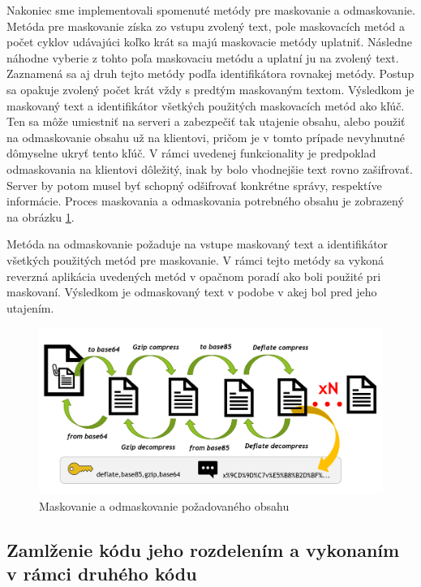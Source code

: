 \documentclass[conference, 11pt,slovak,a4paper,twoside]{IEEEtran}
\begin{document}
Nakoniec sme implementovali spomenuté metódy pre maskovanie a odmaskovanie. Metóda pre maskovanie získa zo vstupu zvolený text, pole maskovacích metód a počet cyklov udávajúci koľko krát sa majú maskovacie metódy uplatniť. Následne náhodne vyberie z tohto poľa maskovaciu metódu a uplatní ju na zvolený text. Zaznamená sa aj druh tejto metódy podľa identifikátora rovnakej metódy. Postup sa opakuje zvolený počet krát vždy s predtým maskovaným textom. Výsledkom je maskovaný text a identifikátor všetkých použitých maskovacích metód ako kľúč. Ten sa môže umiestniť na serveri a zabezpečiť tak utajenie obsahu, alebo použiť na odmaskovanie obsahu už na klientovi, pričom je v tomto prípade nevyhnutné dômyselne ukryť tento kľúč. V rámci uvedenej funkcionality je predpoklad odmaskovania na klientovi dôležitý, inak by bolo vhodnejšie text rovno zašifrovať. Server by potom musel byť schopný odšifrovať konkrétne správy, respektíve informácie. Proces maskovania a odmaskovania potrebného obsahu je zobrazený na obrázku \ref{contentConcealing}.

Metóda na odmaskovanie požaduje na vstupe maskovaný text a identifikátor všetkých použitých metód pre maskovanie. V rámci tejto metódy sa vykoná reverzná aplikácia uvedených metód v opačnom poradí ako boli použité pri maskovaní. Výsledkom je odmaskovaný text v podobe v akej bol pred jeho utajením.


\begin{figure}[!t]  %
					\begin{center}
									\includegraphics[width=\linewidth]{fig/masking.png}
									\caption{Maskovanie a odmaskovanie požadovaného obsahu}
									\label{contentConcealing}
					\end{center}
\end{figure}



\subsection{Zamlženie kódu jeho rozdelením a vykonaním v rámci druhého kódu} \label{codeObfuscation}
\end{document}
